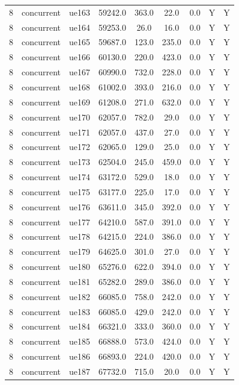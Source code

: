 \begin{table}[ht]
\begin{tabular}{|c|c|c|c|c|c|c|c|c|}
8 & concurrent & ue163 & 59242.0 & 363.0 & 22.0 & 0.0 & Y & Y \\
8 & concurrent & ue164 & 59253.0 & 26.0 & 16.0 & 0.0 & Y & Y \\
8 & concurrent & ue165 & 59687.0 & 123.0 & 235.0 & 0.0 & Y & Y \\
8 & concurrent & ue166 & 60130.0 & 220.0 & 423.0 & 0.0 & Y & Y \\
8 & concurrent & ue167 & 60990.0 & 732.0 & 228.0 & 0.0 & Y & Y \\
8 & concurrent & ue168 & 61002.0 & 393.0 & 216.0 & 0.0 & Y & Y \\
8 & concurrent & ue169 & 61208.0 & 271.0 & 632.0 & 0.0 & Y & Y \\
8 & concurrent & ue170 & 62057.0 & 782.0 & 29.0 & 0.0 & Y & Y \\
8 & concurrent & ue171 & 62057.0 & 437.0 & 27.0 & 0.0 & Y & Y \\
8 & concurrent & ue172 & 62065.0 & 129.0 & 25.0 & 0.0 & Y & Y \\
8 & concurrent & ue173 & 62504.0 & 245.0 & 459.0 & 0.0 & Y & Y \\
8 & concurrent & ue174 & 63172.0 & 529.0 & 18.0 & 0.0 & Y & Y \\
8 & concurrent & ue175 & 63177.0 & 225.0 & 17.0 & 0.0 & Y & Y \\
8 & concurrent & ue176 & 63611.0 & 345.0 & 392.0 & 0.0 & Y & Y \\
8 & concurrent & ue177 & 64210.0 & 587.0 & 391.0 & 0.0 & Y & Y \\
8 & concurrent & ue178 & 64215.0 & 224.0 & 386.0 & 0.0 & Y & Y \\
8 & concurrent & ue179 & 64625.0 & 301.0 & 27.0 & 0.0 & Y & Y \\
8 & concurrent & ue180 & 65276.0 & 622.0 & 394.0 & 0.0 & Y & Y \\
8 & concurrent & ue181 & 65282.0 & 289.0 & 386.0 & 0.0 & Y & Y \\
8 & concurrent & ue182 & 66085.0 & 758.0 & 242.0 & 0.0 & Y & Y \\
8 & concurrent & ue183 & 66085.0 & 429.0 & 242.0 & 0.0 & Y & Y \\
8 & concurrent & ue184 & 66321.0 & 333.0 & 360.0 & 0.0 & Y & Y \\
8 & concurrent & ue185 & 66888.0 & 573.0 & 424.0 & 0.0 & Y & Y \\
8 & concurrent & ue186 & 66893.0 & 224.0 & 420.0 & 0.0 & Y & Y \\
8 & concurrent & ue187 & 67732.0 & 715.0 & 20.0 & 0.0 & Y & Y \\

\end{tabular}
\end{table}
